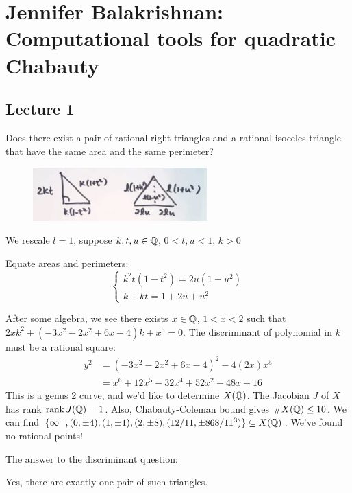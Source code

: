 \newpage
\section{Jennifer Balakrishnan: Computational tools for quadratic Chabauty}
\subsection{Lecture 1}

\begin{ques}
Does there exist a pair of rational right triangles and a rational isoceles triangle that have the same area and the same perimeter?
\end{ques}

	\begin{figure}[!ht]
	\centering
	\includegraphics[width=0.6\textwidth]{../images/im4.png}
	\end{figure}


We rescale $l=1$, suppose $k,t,u \in \mathbb{Q}$, $0<t,u<1$, $k>0$


Equate areas and perimeters:
	\[
	\begin{cases}
	k^2t(1-t^2)= 2u(1-u^2) \\
	k+kt= 1+2u+u^2
	\end{cases}
	\]


After some algebra, we see there exists $x \in \mathbb{Q}$, $1<x<2$ such that $2xk^2+(-3x^2-2x^2+6x-4)k+x^5= 0$. The discriminant of polynomial in $k$ must be a rational square:
	\[
	\begin{aligned}
	y^2&= (-3x^2-2x^2+6x-4)^2-4(2x)x^5 \\
	&=x^6+12x^5-32x^4+52x^2-48x+16
	\end{aligned}
	\]
This is a genus 2 curve, and we'd like to determine $X(\mathbb{Q})$. The Jacobian $J$ of $X$ has rank $\operatorname{rank} J(\mathbb{Q})=1$. Also, Chabauty-Coleman bound gives $\#X(\mathbb{Q}) \leq 10$. We can find $\{\infty^\pm, (0,\pm 4), (1,\pm 1), (2, \pm 8), (12/11,\pm 868/11^3) \} \subseteq X(\mathbb{Q})$. We've found no rational points!


The answer to the discriminant question:


\begin{thm}
Yes, there are exactly one pair of such triangles.
\end{thm}



